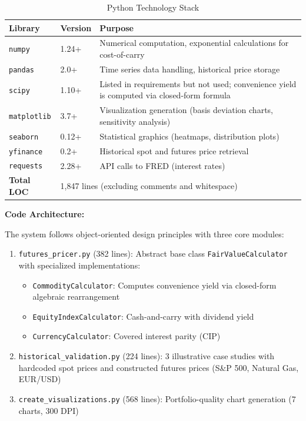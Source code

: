 \documentclass[12pt,a4paper]{article}
\begin{document}
\begin{table}[H]
\centering
\caption{Python Technology Stack}
\label{tab:tech_stack}
\begin{tabular}{@{}llp{7cm}@{}}
\toprule
\textbf{Library} & \textbf{Version} & \textbf{Purpose} \\
\midrule
\texttt{numpy} & 1.24+ & Numerical computation, exponential calculations for cost-of-carry \\
\texttt{pandas} & 2.0+ & Time series data handling, historical price storage \\
\texttt{scipy} & 1.10+ & Listed in requirements but not used; convenience yield is computed via closed-form formula \\
\texttt{matplotlib} & 3.7+ & Visualization generation (basis deviation charts, sensitivity analysis) \\
\texttt{seaborn} & 0.12+ & Statistical graphics (heatmaps, distribution plots) \\
\texttt{yfinance} & 0.2+ & Historical spot and futures price retrieval \\
\texttt{requests} & 2.28+ & API calls to FRED (interest rates) \\
\midrule
\textbf{Total LOC} & \multicolumn{2}{l}{1,847 lines (excluding comments and whitespace)} \\
\bottomrule
\end{tabular}
\end{table}

\textbf{Code Architecture:}

The system follows object-oriented design principles with three core modules:

\begin{enumerate}
    \item \texttt{futures\_pricer.py} (382 lines): Abstract base class \texttt{FairValueCalculator} with specialized implementations:
    \begin{itemize}
        \item \texttt{CommodityCalculator}: Computes convenience yield via closed-form algebraic rearrangement
        \item \texttt{EquityIndexCalculator}: Cash-and-carry with dividend yield
        \item \texttt{CurrencyCalculator}: Covered interest parity (CIP)
    \end{itemize}

    \item \texttt{historical\_validation.py} (224 lines): 3 illustrative case studies with hardcoded spot prices and constructed futures prices (S\&P 500, Natural Gas, EUR/USD)

    \item \texttt{create\_visualizations.py} (568 lines): Portfolio-quality chart generation (7 charts, 300 DPI)
\end{enumerate}
\end{document}
